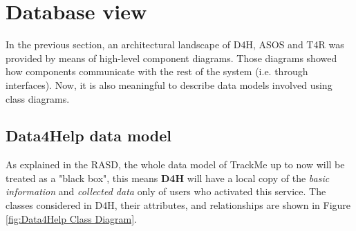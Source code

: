 \documentclass[a4paper, hidelinks, 12pt]{report}
\begin{document}
	\section{Database view}
In the previous section, an architectural landscape of D4H, ASOS and T4R was provided by means of high-level component diagrams. Those diagrams showed how components communicate with the rest of the system (i.e. through interfaces). Now, it is also meaningful to describe data models involved using class diagrams. 
	
	\subsection{Data4Help data model}
	As explained in the RASD, the whole data model of TrackMe up to now will be treated as a "black box", this means \textbf{D4H} will have a local copy of the \textit{basic information} and \textit{collected data} only of users who activated this service. The classes considered in D4H, their attributes, and relationships are shown in Figure \ref{fig:Data4Help Class Diagram}.
	
\end{document}
